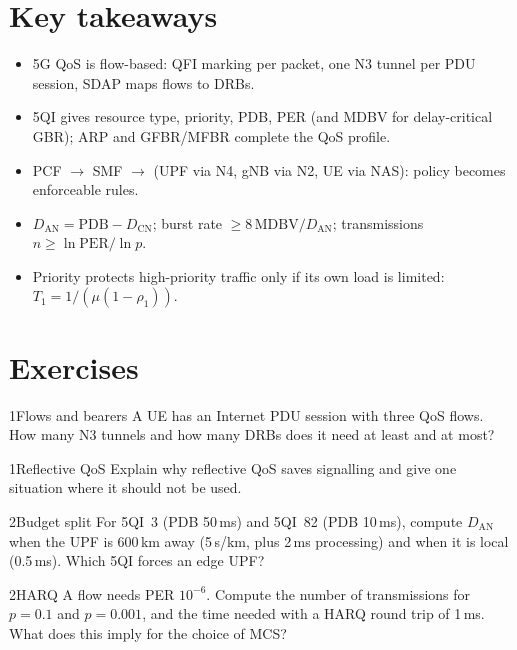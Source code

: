 \documentclass[11pt,a4paper]{article}
\begin{document}
\section{Key takeaways}
\begin{takeawaybox}
\begin{itemize}
  \item 5G QoS is flow-based: QFI marking per packet, one N3 tunnel per PDU session, SDAP maps flows to DRBs.
  \item 5QI gives resource type, priority, PDB, PER (and MDBV for delay-critical GBR); ARP and GFBR/MFBR complete the QoS profile.
  \item PCF $\to$ SMF $\to$ (UPF via N4, gNB via N2, UE via NAS): policy becomes enforceable rules.
  \item $D_{\mathrm{AN}} = \mathrm{PDB} - D_{\mathrm{CN}}$; burst rate $\ge 8\,\mathrm{MDBV}/D_{\mathrm{AN}}$; transmissions $n \ge \ln\mathrm{PER}/\ln p$.
  \item Priority protects high-priority traffic only if its own load is limited: $T_1 = 1/(\mu(1-\rho_1))$.
\end{itemize}
\end{takeawaybox}

\section{Exercises}

\begin{exercisebox}{1}{Flows and bearers}\label{exr:flows}
A UE has an Internet PDU session with three QoS flows. How many N3 tunnels and how many DRBs does it need at least and at most?
\end{exercisebox}

\begin{exercisebox}{1}{Reflective QoS}\label{exr:rq}
Explain why reflective QoS saves signalling and give one situation where it should not be used.
\end{exercisebox}

\begin{exercisebox}{2}{Budget split}\label{exr:pdb}
For 5QI~3 (PDB 50\,ms) and 5QI~82 (PDB 10\,ms), compute $D_{\mathrm{AN}}$ when the UPF is 600\,km away (5\,\textmu s/km, plus 2\,ms processing) and when it is local
(0.5\,ms). Which 5QI forces an edge UPF?
\end{exercisebox}

\begin{exercisebox}{2}{HARQ}\label{exr:harq}
A flow needs PER $10^{-6}$. Compute the number of transmissions for $p = 0.1$ and $p = 0.001$, and the time needed with a HARQ round trip of 1\,ms. What does this
imply for the choice of MCS?
\end{exercisebox}
\end{document}
